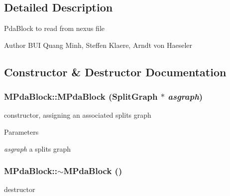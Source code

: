 \subsection{Detailed Description}
PdaBlock to read from nexus file

\begin{DoxyAuthor}{Author}
BUI Quang Minh, Steffen Klaere, Arndt von Haeseler 
\end{DoxyAuthor}


\subsection{Constructor \& Destructor Documentation}
\hypertarget{classMPdaBlock_ae7836b51af1d605dc14372c86b0e996f}{
\subsubsection[{MPdaBlock}]{\setlength{\rightskip}{0pt plus 5cm}MPdaBlock::MPdaBlock ({\bf SplitGraph} $\ast$ {\em asgraph})}}
\label{classMPdaBlock_ae7836b51af1d605dc14372c86b0e996f}
constructor, assigning an associated splits graph 
\begin{DoxyParams}{Parameters}
\item[{\em asgraph}]a splits graph \end{DoxyParams}
\hypertarget{classMPdaBlock_a89cff585f4dcb2f8a2ee1fd6a1c325b0}{
\subsubsection[{$\sim$MPdaBlock}]{\setlength{\rightskip}{0pt plus 5cm}MPdaBlock::$\sim$MPdaBlock ()}}
\label{classMPdaBlock_a89cff585f4dcb2f8a2ee1fd6a1c325b0}
destructor 

